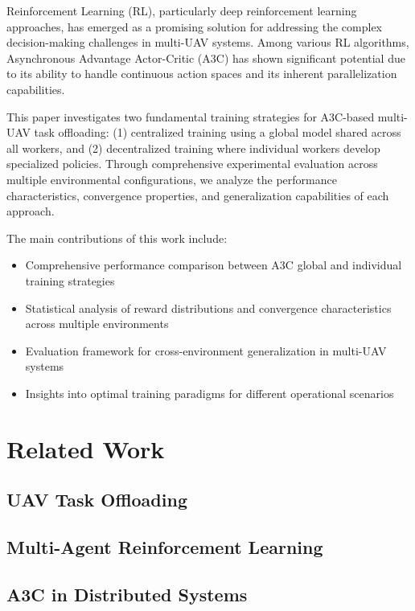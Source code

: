 \documentclass[journal]{IEEEtran}
\begin{document}
Reinforcement Learning (RL), particularly deep reinforcement learning approaches, has emerged as a promising solution for addressing the complex decision-making challenges in multi-UAV systems. Among various RL algorithms, Asynchronous Advantage Actor-Critic (A3C) has shown significant potential due to its ability to handle continuous action spaces and its inherent parallelization capabilities.

This paper investigates two fundamental training strategies for A3C-based multi-UAV task offloading: (1) centralized training using a global model shared across all workers, and (2) decentralized training where individual workers develop specialized policies. Through comprehensive experimental evaluation across multiple environmental configurations, we analyze the performance characteristics, convergence properties, and generalization capabilities of each approach.

The main contributions of this work include:
\begin{itemize}
\item Comprehensive performance comparison between A3C global and individual training strategies
\item Statistical analysis of reward distributions and convergence characteristics across multiple environments
\item Evaluation framework for cross-environment generalization in multi-UAV systems
\item Insights into optimal training paradigms for different operational scenarios
\end{itemize}

\section{Related Work}
\label{sec:related_work}

\subsection{UAV Task Offloading}

\subsection{Multi-Agent Reinforcement Learning}

\subsection{A3C in Distributed Systems}
\end{document}
